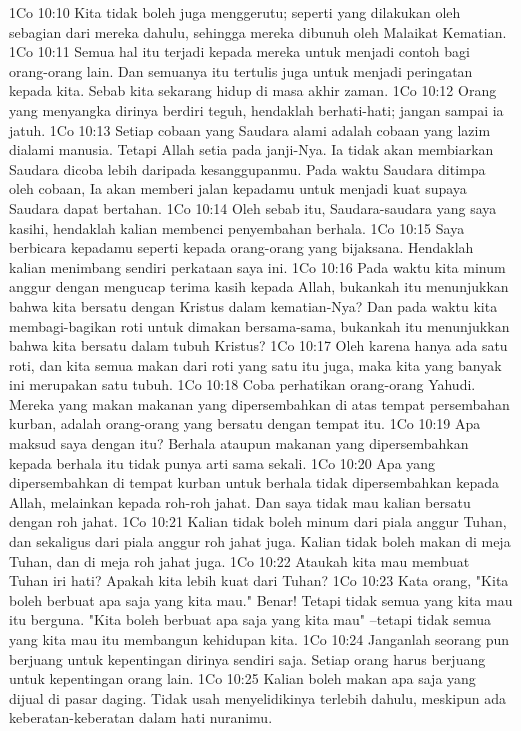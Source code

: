 1Co 10:10  Kita tidak boleh juga menggerutu; seperti yang dilakukan oleh sebagian dari mereka dahulu, sehingga mereka dibunuh oleh Malaikat Kematian.
1Co 10:11  Semua hal itu terjadi kepada mereka untuk menjadi contoh bagi orang-orang lain. Dan semuanya itu tertulis juga untuk menjadi peringatan kepada kita. Sebab kita sekarang hidup di masa akhir zaman.
1Co 10:12  Orang yang menyangka dirinya berdiri teguh, hendaklah berhati-hati; jangan sampai ia jatuh.
1Co 10:13  Setiap cobaan yang Saudara alami adalah cobaan yang lazim dialami manusia. Tetapi Allah setia pada janji-Nya. Ia tidak akan membiarkan Saudara dicoba lebih daripada kesanggupanmu. Pada waktu Saudara ditimpa oleh cobaan, Ia akan memberi jalan kepadamu untuk menjadi kuat supaya Saudara dapat bertahan.
1Co 10:14  Oleh sebab itu, Saudara-saudara yang saya kasihi, hendaklah kalian membenci penyembahan berhala.
1Co 10:15  Saya berbicara kepadamu seperti kepada orang-orang yang bijaksana. Hendaklah kalian menimbang sendiri perkataan saya ini.
1Co 10:16  Pada waktu kita minum anggur dengan mengucap terima kasih kepada Allah, bukankah itu menunjukkan bahwa kita bersatu dengan Kristus dalam kematian-Nya? Dan pada waktu kita membagi-bagikan roti untuk dimakan bersama-sama, bukankah itu menunjukkan bahwa kita bersatu dalam tubuh Kristus?
1Co 10:17  Oleh karena hanya ada satu roti, dan kita semua makan dari roti yang satu itu juga, maka kita yang banyak ini merupakan satu tubuh.
1Co 10:18  Coba perhatikan orang-orang Yahudi. Mereka yang makan makanan yang dipersembahkan di atas tempat persembahan kurban, adalah orang-orang yang bersatu dengan tempat itu.
1Co 10:19  Apa maksud saya dengan itu? Berhala ataupun makanan yang dipersembahkan kepada berhala itu tidak punya arti sama sekali.
1Co 10:20  Apa yang dipersembahkan di tempat kurban untuk berhala tidak dipersembahkan kepada Allah, melainkan kepada roh-roh jahat. Dan saya tidak mau kalian bersatu dengan roh jahat.
1Co 10:21  Kalian tidak boleh minum dari piala anggur Tuhan, dan sekaligus dari piala anggur roh jahat juga. Kalian tidak boleh makan di meja Tuhan, dan di meja roh jahat juga.
1Co 10:22  Ataukah kita mau membuat Tuhan iri hati? Apakah kita lebih kuat dari Tuhan?
1Co 10:23  Kata orang, "Kita boleh berbuat apa saja yang kita mau." Benar! Tetapi tidak semua yang kita mau itu berguna. "Kita boleh berbuat apa saja yang kita mau" --tetapi tidak semua yang kita mau itu membangun kehidupan kita.
1Co 10:24  Janganlah seorang pun berjuang untuk kepentingan dirinya sendiri saja. Setiap orang harus berjuang untuk kepentingan orang lain.
1Co 10:25  Kalian boleh makan apa saja yang dijual di pasar daging. Tidak usah menyelidikinya terlebih dahulu, meskipun ada keberatan-keberatan dalam hati nuranimu.
